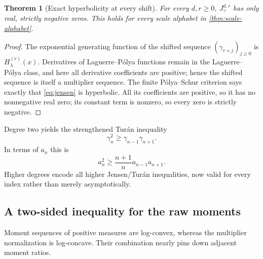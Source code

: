 \documentclass[11pt]{article}
\numberwithin{equation}{section}
\newtheorem{theorem}{Theorem}[section]
\theoremstyle{definition}
\theoremstyle{remark}
\begin{document}
\begin{theorem}[Exact hyperbolicity at every shift]\label{thm:jensen}
For every $d,r\ge0$, $J_\gamma^{d,r}$ has only real, strictly negative zeros.  This holds for every scale alphabet in \cref{thm:scale-alphabet}.
\end{theorem}
\begin{proof}
The exponential generating function of the shifted sequence $(\gamma_{r+j})_{j\ge0}$ is $H_\lambda^{(r)}(x)$.  Derivatives of Laguerre--Pólya functions remain in the Laguerre--Pólya class, and here all derivative coefficients are positive; hence the shifted sequence is itself a multiplier sequence.  The finite Pólya--Schur criterion says exactly that \eqref{eq:jensen} is hyperbolic.  All its coefficients are positive, so it has no nonnegative real zero; its constant term is nonzero, so every zero is strictly negative.
\end{proof}

Degree two yields the strengthened Turán inequality
\begin{equation}\label{eq:gamma-turan}
 \gamma_n^2\ge\gamma_{n-1}\gamma_{n+1}.
\end{equation}
In terms of $a_n$ this is
\begin{equation}\label{eq:strong-a-turan}
 a_n^2\ge\frac{n+1}{n}a_{n-1}a_{n+1}.
\end{equation}
Higher degrees encode all higher Jensen/Turán inequalities, now valid for every index rather than merely asymptotically.

\subsection{A two-sided inequality for the raw moments}

Moment sequences of positive measures are log-convex, whereas the multiplier normalization is log-concave.  Their combination nearly pins down adjacent moment ratios.
\end{document}
